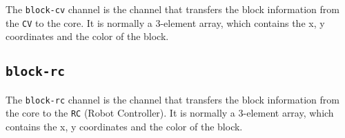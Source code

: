 \documentclass[
]{article}
\begin{document}
The \texttt{block-cv} channel is the channel that transfers the block
information from the \texttt{CV} to the core. It is normally a 3-element
array, which contains the x, y coordinates and the color of the block.

\hypertarget{block-rc}{%
\subsection{\texorpdfstring{\texttt{block-rc}}{block-rc}}\label{block-rc}}

The \texttt{block-rc} channel is the channel that transfers the block
information from the core to the \texttt{RC} (Robot Controller). It is
normally a 3-element array, which contains the x, y coordinates and the
color of the block.
\end{document}
